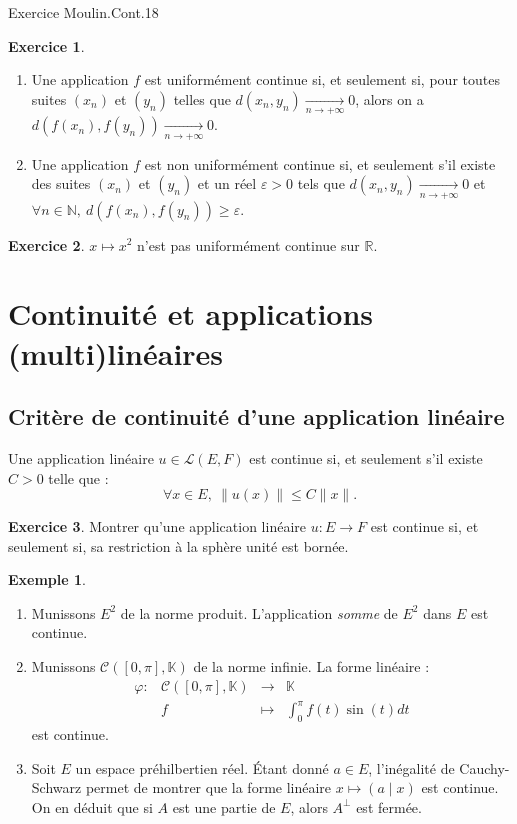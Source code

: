 \documentclass[french]{article}
\newcommand{\N}{\mathbb{N}}
\newcommand{\R}{\mathbb{R}}
\newcommand{\K}{\mathbb{K}}
\theoremstyle{plain}
\theoremstyle{definition}
\newtheorem*{ex}{Exemple}
\newtheorem{exo}{Exercice}
\theoremstyle{remark}
\begin{document}
Exercice Moulin.Cont.18

\begin{exo}
	\begin{enumerate}
		\item Une application $f$ est uniformément continue si, et seulement si, pour toutes suites $(x_n)$ et $(y_n)$ telles que $d(x_n,y_n)\xrightarrow[n\to+\infty]{}0$, alors on a $d(f(x_n),f(y_n))\xrightarrow[n\to+\infty]{}0$.
		\item Une application $f$ est non uniformément continue si, et seulement s'il existe des suites $(x_n)$ et $(y_n)$ et un réel $\varepsilon>0$ tels que $d(x_n,y_n)\xrightarrow[n\to+\infty]{}0$ et $\forall n\in\N,\ d(f(x_n),f(y_n))\geqslant\varepsilon$.
	\end{enumerate}
\end{exo}

\begin{exo}
	$x\mapsto x^2$ n'est pas uniformément continue sur $\R$. %
\end{exo}

\section{Continuité et applications (multi)linéaires}

\subsection{Critère de continuité d'une application linéaire}

\begin{thm}{}%
	Une application linéaire $u\in\mathcal{L}(E,F)$ est continue si, et seulement s'il existe $C>0$ telle que : $$\forall x\in E,\ \lVert u(x)\rVert\leqslant C\lVert x\rVert.$$ 
\end{thm}

\begin{exo}
	Montrer qu'une application linéaire $u:E\to F$ est continue si, et seulement si, sa restriction à la sphère unité est bornée.
\end{exo}

\begin{ex}
	\begin{enumerate}
		\item Munissons $E^2$ de la norme produit. L'application \textit{somme} de $E^2$ dans $E$ est continue.
		\item Munissons $\mathcal{C}([0,\pi],\K)$ de la norme infinie. La forme linéaire :
		$$\begin{array}{lrcl}
			\varphi:&\mathcal{C}([0,\pi],\K)&\longrightarrow&\K\\
			&f&\longmapsto&\displaystyle\int_{0}^{\pi}f(t)\sin(t)dt
		\end{array}$$ est continue.
		\item Soit $E$ un espace préhilbertien réel. Étant donné $a\in E$, l'inégalité de Cauchy-Schwarz permet de montrer que la forme linéaire $x\mapsto (a\mid x)$ est continue. On en déduit que si $A$ est une partie de $E$, alors $A^\bot$ est fermée.
	\end{enumerate}
\end{ex}
\end{document}
